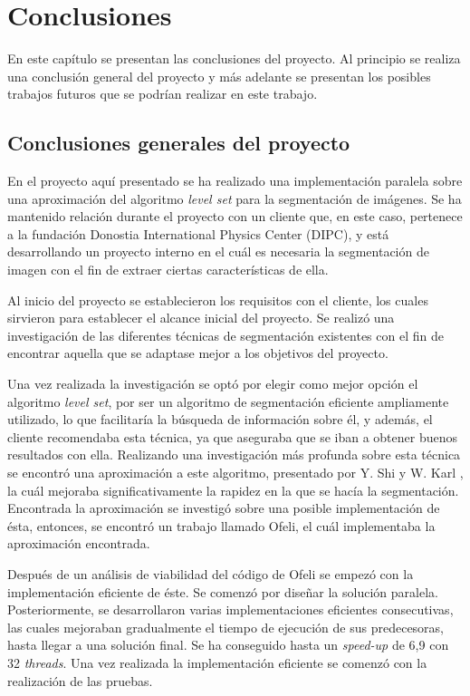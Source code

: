 \chapter{Conclusiones}

En este cap\'{i}tulo se presentan las conclusiones del proyecto. Al principio se realiza una conclusi\'{o}n general del proyecto y m\'{a}s adelante se presentan los posibles trabajos futuros que se podr\'{i}an realizar en este trabajo.

\section{Conclusiones generales del proyecto}

En el proyecto aqu\'{i} presentado se ha realizado una implementaci\'{o}n paralela sobre una aproximaci\'{o}n del algoritmo \textit{level set} para la segmentaci\'{o}n de im\'{a}genes. Se ha mantenido relaci\'{o}n durante el proyecto con un cliente que, en este caso, pertenece a la fundaci\'{o}n Donostia International Physics Center (DIPC), y est\'{a} desarrollando un proyecto interno en el cu\'{a}l es necesaria la segmentaci\'{o}n de imagen con el fin de extraer ciertas caracter\'{i}sticas de ella. 

Al inicio del proyecto se establecieron los requisitos con el cliente, los cuales sirvieron para establecer el alcance inicial del proyecto. Se realiz\'{o} una investigaci\'{o}n de las diferentes t\'{e}cnicas de segmentaci\'{o}n existentes con el fin de encontrar aquella que se adaptase mejor a los objetivos del proyecto. 

Una vez realizada la investigaci\'{o}n se opt\'{o} por elegir como mejor opci\'{o}n el algoritmo \textit{level set}, por ser un algoritmo de segmentaci\'{o}n eficiente ampliamente utilizado, lo que facilitar\'{i}a la b\'{u}squeda de informaci\'{o}n sobre \'{e}l, y adem\'{a}s, el cliente recomendaba esta t\'{e}cnica, ya que aseguraba que se iban a obtener buenos resultados con ella. Realizando una investigaci\'{o}n m\'{a}s profunda sobre esta t\'{e}cnica se encontr\'{o} una aproximaci\'{o}n a este algoritmo, presentado por Y. Shi y W. Karl \cite{yong1}, la cu\'{a}l mejoraba significativamente la rapidez en la que se hac\'{i}a la segmentaci\'{o}n. Encontrada la aproximaci\'{o}n se investig\'{o} sobre una posible implementaci\'{o}n de \'{e}sta, entonces, se encontr\'{o} un trabajo llamado Ofeli, el cu\'{a}l implementaba la aproximaci\'{o}n encontrada.

Despu\'{e}s de un an\'{a}lisis de viabilidad del c\'{o}digo de Ofeli se empez\'{o} con la implementaci\'{o}n eficiente de \'{e}ste. Se comenz\'{o} por dise\~{n}ar la soluci\'{o}n paralela. Posteriormente, se desarrollaron varias implementaciones eficientes consecutivas, las cuales mejoraban gradualmente el tiempo de ejecuci\'{o}n de sus predecesoras, hasta llegar a una soluci\'{o}n final. Se ha conseguido hasta un \textit{speed-up} de 6,9 con 32 \textit{threads}. Una vez realizada la implementaci\'{o}n eficiente se comenz\'{o} con la realizaci\'{o}n de las pruebas.

